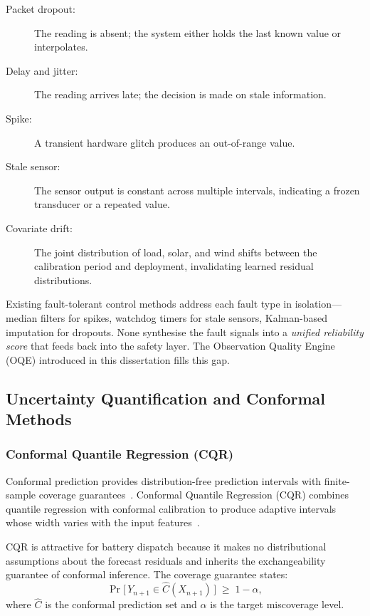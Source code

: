 \begin{description}
  \item[Packet dropout:] The reading is absent; the system either holds
    the last known value or interpolates.
  \item[Delay and jitter:] The reading arrives late; the decision is made
    on stale information.
  \item[Spike:] A transient hardware glitch produces an out-of-range
    value.
  \item[Stale sensor:] The sensor output is constant across multiple
    intervals, indicating a frozen transducer or a repeated value.
  \item[Covariate drift:] The joint distribution of load, solar, and wind
    shifts between the calibration period and deployment, invalidating
    learned residual distributions.
\end{description}

Existing fault-tolerant control methods address each fault type in
isolation---median filters for spikes, watchdog timers for stale
sensors, Kalman-based imputation for dropouts.  None synthesise the
fault signals into a \emph{unified reliability score} that feeds back
into the safety layer.  The Observation Quality Engine (OQE) introduced
in this dissertation fills this gap.

\subsection{Uncertainty Quantification and Conformal Methods}

\subsubsection{Conformal Quantile Regression (CQR)}

Conformal prediction provides distribution-free prediction intervals with
finite-sample coverage guarantees~\cite{vovk2005algorithmic}.  Conformal
Quantile Regression (CQR) combines quantile regression with conformal
calibration to produce adaptive intervals whose width varies with the
input features~\cite{romano2019conformalized}.

CQR is attractive for battery dispatch because it makes no distributional
assumptions about the forecast residuals and inherits the exchangeability
guarantee of conformal inference.  The coverage guarantee states:
\[
  \Pr\!\bigl[\,Y_{n+1} \in \hat{C}(X_{n+1})\,\bigr]
  \;\ge\; 1 - \alpha,
\]
where $\hat{C}$ is the conformal prediction set and $\alpha$ is the
target miscoverage level.

